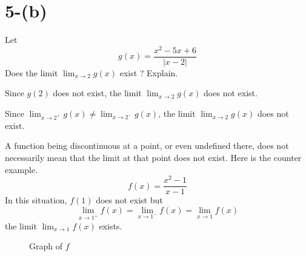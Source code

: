 \documentclass{article}
\begin{document}
\newpage

\section{5-(b)}
\begin{problem}
	Let \[
		g(x) = \frac{x^2-5x+6}{|x-2|}
	\]
	Does the limit $\displaystyle \lim_{x\rightarrow2} g(x)$ exist ? Explain.
\end{problem}
\vspace{-12pt}
\begin{wrong}
	Since $g(2)$ does not exist, the limit $\displaystyle \lim_{x\rightarrow2} g(x)$ does not exist.
\end{wrong}
\vspace{-12pt}
\begin{cor}
	Since $\displaystyle \lim_{x\rightarrow2^+}g(x) \neq \lim_{x\rightarrow2^-}g(x)$, the limit $\displaystyle \lim_{x\rightarrow2} g(x)$ does not exist.
\end{cor}

\begin{reason}
A function being discontinuous at a point, or even undefined there, does not necessarily mean that the limit at that point does not exist. Here is the counter example.
\[
f(x) = \frac{x^2 - 1}{x - 1}
\]
In this situation, $f(1)$ does not exist but 
\[
\lim_{x\rightarrow1^+}f(x) = \lim_{x\rightarrow1^-}f(x) = \lim_{x\rightarrow1}f(x)
\]
the limit $\displaystyle \lim_{x\rightarrow1}f(x)$ exists.
\end{reason}

\vspace{2em}

\begin{center}
	\begin{figure}[H]
		\caption{Graph of $f$}
	\end{figure}
\end{center}
\end{document}
